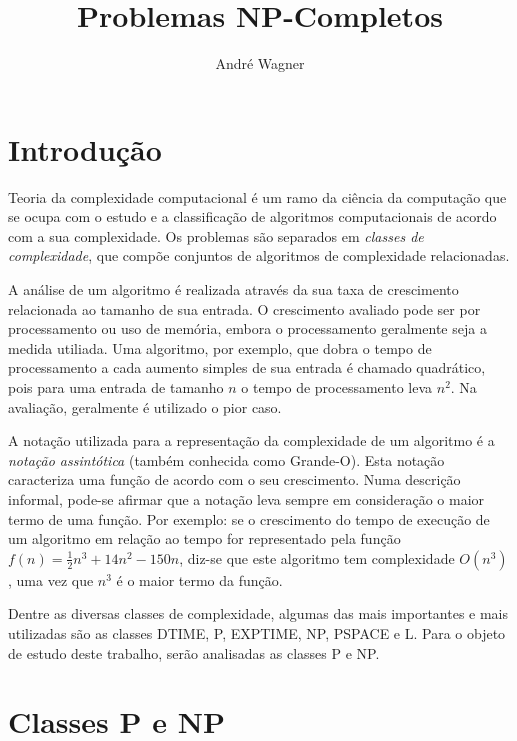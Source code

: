 \documentclass[a4paper,twocolumn]{article}
\author{André Wagner}
\title{Problemas NP-Completos}
\date{}
\begin{document}
\maketitle


\section{Introdução}

Teoria da complexidade computacional é um ramo da ciência da computação que se ocupa com o estudo e a classificação de algoritmos computacionais de acordo com a sua complexidade. Os problemas são separados em \emph{classes de complexidade}, que compõe conjuntos de algoritmos de complexidade relacionadas. 

A análise de um algoritmo é realizada através da sua taxa de crescimento relacionada ao tamanho de sua entrada. O crescimento avaliado pode ser por processamento ou uso de memória, embora o processamento geralmente seja a medida utiliada. Uma algoritmo, por exemplo, que dobra o tempo de processamento a cada aumento simples de sua entrada é chamado quadrático, pois para uma entrada de tamanho $n$ o tempo de processamento leva $n^2$. Na avaliação, geralmente é utilizado o pior caso.

A notação utilizada para a representação da complexidade de um algoritmo é a \emph{notação assintótica} (também conhecida como Grande-O). Esta notação caracteriza uma função de acordo com o seu crescimento. Numa descrição informal, pode-se afirmar que a notação leva sempre em consideração o maior termo de uma função. Por exemplo: se o crescimento do tempo de execução de um algoritmo em relação ao tempo for representado pela função $f(n) = \frac{1}{2}n^3 + 14n^2 - 150n$, diz-se que este algoritmo tem complexidade $O(n^3)$, uma vez que $n^3$ é o maior termo da função.

Dentre as diversas classes de complexidade, algumas das mais importantes e mais utilizadas são as classes DTIME, P, EXPTIME, NP, PSPACE e L. Para o objeto de estudo deste trabalho, serão analisadas as classes P e NP.



\section{Classes P e NP}
\end{document}
